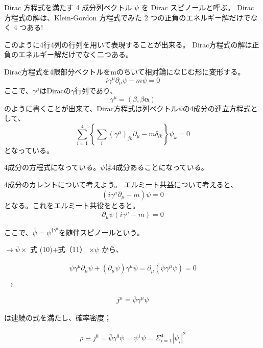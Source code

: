 \documentclass[titlepage]{ltjsarticle}
\begin{document}
Dirac 方程式を満たす 4 成分列ベクトル \(\psi\) を Dirac スピノールと呼ぶ。
Dirac 方程式の解は、Klein-Gordon 方程式でみた 2 つの正負のエネルギー解だけでな く 4 つある!

このように4行4列の行列を用いて表現することが出来る。
Dirac方程式の解は正負のエネルギー解だけでなく二つある。

Dirac方程式を4限部分ベクトルをmのちいて相対論になじむ形に変形する。
\begin{equation}
  i \gamma^{\mu} \partial_{\mu} \psi - m \psi = 0
\end{equation}
ここで、\(\gamma^{\mu}\)はDiracの\(\gamma\)行列であり、
\begin{equation}
  \gamma^{\mu} = \left( \beta,\beta \bm{\alpha} \right)
\end{equation}
のように書くことが出来て、Dirac方程式は列ベクトル\(\psi\)の4成分の連立方程式として、
\begin{equation}
  \sum_{i=1}^{4}\left\{ \sum_{i} (\gamma^{\mu})_{jk} \partial_{\mu} - m\delta_{lk} \right\}\psi_k = 0
\end{equation}
となっている。

4成分の方程式になっている。\(\psi\)は4成分あることになっている。

4成分のカレントについて考えよう。
エルミート共益について考えると、
\begin{equation}
  (i \gamma^{\mu} \partial_\mu -m )\psi = 0
\end{equation}
となる。これをエルミート共役をとると。
\begin{equation}
  \partial_\mu\bar{\psi} (i \gamma^{\mu} -m ) = 0
\end{equation}

ここで、\(\bar{\psi}= \psi^{\dagger\gamma^0}\)を随伴スピノールという。

\(\rightarrow \bar{\psi} \times\) 式 (10)+式（11） \(\times \psi\) から、

\begin{align*}
\bar{\psi} \gamma^\mu \partial_\mu \psi+\left(\partial_\mu \bar{\psi}\right) \gamma^\mu \psi=\partial_\mu\left(\bar{\psi} \gamma^\mu \psi\right)=0
\end{align*}

\(\rightarrow\)

\begin{align*}
j^\mu=\bar{\psi} \gamma^\mu \psi
\end{align*}


は連続の式を満たし、確率密度；

\begin{align*}
\rho \equiv j^0=\bar{\psi} \gamma^0 \psi=\psi^{\dagger} \psi=\Sigma_{i=1}^4\left|\psi_i\right|^2
\end{align*}
\end{document}
